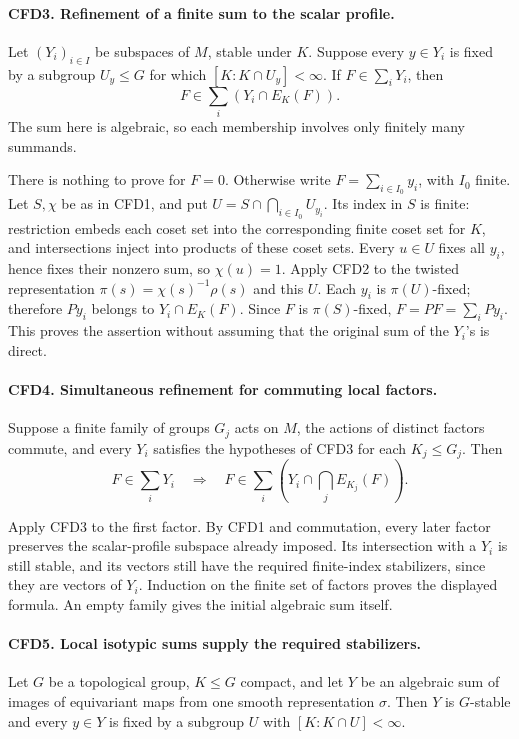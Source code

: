\documentclass[11pt,a4paper]{article}
\numberwithin{equation}{section}
\theoremstyle{remark}\newtheorem{remark}[theorem]{Remark}
\begin{document}
\paragraph{CFD3. Refinement of a finite sum to the scalar profile.}
\label{claim:CFD3}
Let \((Y_i)_{i\in I}\) be subspaces of \(M\), stable under \(K\).
Suppose every \(y\in Y_i\) is fixed by a subgroup \(U_y\le G\) for
which \([K:K\cap U_y]<\infty\).  If
\(F\in\sum_iY_i\), then
\[
                         F\in\sum_i(Y_i\cap E_K(F)).
\]
The sum here is algebraic, so each membership involves only finitely many
summands.

There is nothing to prove for \(F=0\).  Otherwise write
\(F=\sum_{i\in I_0}y_i\), with \(I_0\) finite.  Let \(S,\chi\)
be as in CFD1, and put \(U=S\cap\bigcap_{i\in I_0}U_{y_i}\).
Its index in \(S\) is finite: restriction embeds each coset set into the
corresponding finite coset set for \(K\), and intersections inject into
products of these coset sets.  Every \(u\in U\) fixes all \(y_i\), hence
fixes their nonzero sum, so \(\chi(u)=1\).  Apply CFD2 to the twisted
representation \(\pi(s)=\chi(s)^{-1}\rho(s)\) and this \(U\).
Each \(y_i\) is \(\pi(U)\)-fixed; therefore \(Py_i\) belongs to
\(Y_i\cap E_K(F)\).  Since \(F\) is \(\pi(S)\)-fixed,
\(F=PF=\sum_iPy_i\).  This proves the assertion without assuming that
the original sum of the \(Y_i\)'s is direct.

\paragraph{CFD4. Simultaneous refinement for commuting local factors.}
\label{claim:CFD4}
Suppose a finite family of groups \(G_j\) acts on \(M\), the actions
of distinct factors commute, and every \(Y_i\) satisfies the hypotheses
of CFD3 for each \(K_j\le G_j\).  Then
\[
 F\in\sum_iY_i\quad\Longrightarrow\quad
 F\in\sum_i\left(Y_i\cap\bigcap_j E_{K_j}(F)\right).
\]

Apply CFD3 to the first factor.  By CFD1 and commutation, every later
factor preserves the scalar-profile subspace already imposed.  Its
intersection with a \(Y_i\) is still stable, and its vectors still have
the required finite-index stabilizers, since they are vectors of \(Y_i\).
Induction on the finite set of factors proves the displayed formula.
An empty family gives the initial algebraic sum itself.

\paragraph{CFD5. Local isotypic sums supply the required stabilizers.}
\label{claim:CFD5}
Let \(G\) be a topological group, \(K\le G\) compact, and let
\(Y\) be an algebraic sum of images of equivariant maps from one smooth
representation \(\sigma\).  Then \(Y\) is \(G\)-stable and every
\(y\in Y\) is fixed by a subgroup \(U\) with
\([K:K\cap U]<\infty\).
\end{document}
